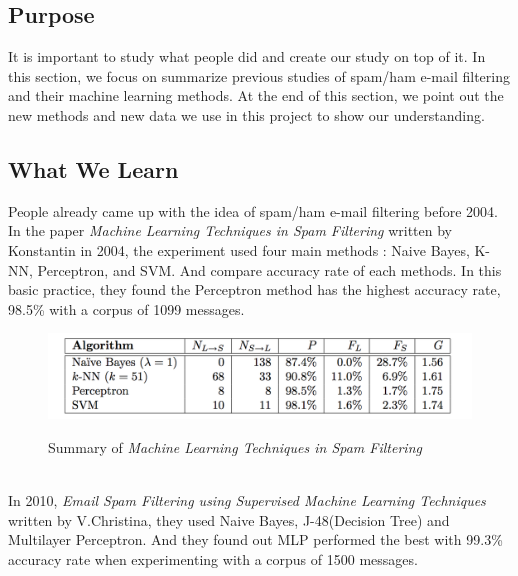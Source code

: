 
\subsection{Purpose}

It is important to study what people did and create our study on top of it. In this section, we focus on summarize previous studies of spam/ham e-mail filtering and their machine learning methods. At the end of this section, we point out the new methods and new data we use in this project to show our understanding.  \\

\subsection{What We Learn}
People already came up with the idea of spam/ham e-mail filtering before 2004. In the paper \textit{Machine Learning Techniques in Spam Filtering} written by Konstantin in 2004, the experiment used four main methods : Naive Bayes, K-NN, Perceptron, and SVM. And compare accuracy rate of each methods. In this basic practice, they found the Perceptron method has the highest accuracy rate, 98.5\% with a corpus of 1099 messages. \\

\begin{figure}[H]
	\centering
	\includegraphics[scale=1.0, width=\linewidth]{2004.png}\\
	\caption{Summary of \textit{Machine Learning Techniques in Spam Filtering}}
	\label{paper_summary_2004}
\end{figure}\\

In 2010, \textit{Email Spam Filtering using Supervised Machine Learning Techniques } written by V.Christina, they used Naive Bayes, J-48(Decision Tree) and Multilayer Perceptron. And they found out MLP performed the best with 99.3\% accuracy rate when experimenting with a corpus of 1500 messages.\\

